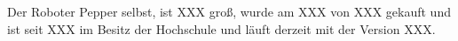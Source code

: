 
Der Roboter Pepper selbst, ist XXX groß, wurde am XXX von XXX gekauft und ist seit XXX im Besitz der Hochschule
und läuft derzeit mit der Version XXX.






